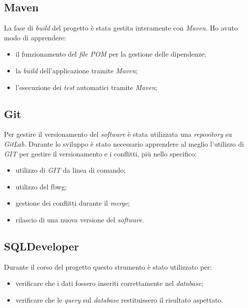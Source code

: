 \subsection{Maven}
La fase di \textit{build} del progetto è stata gestita interamente con \textit{Maven}.
Ho avuto modo di apprendere:
\begin{itemize}
    \item il funzionamento del \textit{file POM} per la gestione delle dipendenze;
    \item la \textit{build} dell'applicazione tramite \textit{Maven};
    \item l'esecuzione dei \textit{test} automatici tramite \textit{Maven};
\end{itemize}

\subsection{Git}
Per gestire il versionamento del \textit{software} è stata utilizzata una \textit{repository} su \textit{GitLab}. Durante lo sviluppo è stato necessario apprendere al meglio l'utilizzo di \textit{GIT} per gestire il versionamento e i conflitti, più nello specifico:
\begin{itemize}
    \item utilizzo di \textit{GIT} da linea di comando;
    \item utilizzo del \gls{fbwg}\glsfirstoccur{};
    \item gestione dei conflitti durante il \textit{merge};
    \item rilascio di una nuova versione del \textit{software}.
\end{itemize}

\subsection{SQLDeveloper}
Durante il corso del progetto questo strumento è stato utilizzato per:
\begin{itemize}
    \item verificare che i dati fossero inseriti correttamente nel \textit{database};
    \item verificare che le \textit{query} sul \textit{database} restituissero il risultato aspettato.
\end{itemize}

